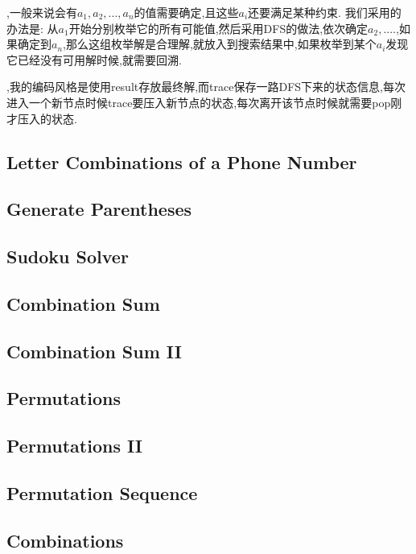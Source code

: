 
,一般来说会有$a_1, a_2, ..., a_n$的值需要确定,且这些$a_i$还要满足某种约束. 我们采用的办法是: 从$a_1$开始分别枚举它的所有可能值,然后采用DFS的做法,依次确定$a_2, ....$,如果确定到$a_n$,那么这组枚举解是合理解,就放入到搜索结果中,如果枚举到某个$a_i$发现它已经没有可用解时候,就需要回溯.

,我的编码风格是使用result存放最终解,而trace保存一路DFS下来的状态信息,每次进入一个新节点时候trace要压入新节点的状态,每次离开该节点时候就需要pop刚才压入的状态.
\subsection{Letter Combinations of a Phone Number}

\subsection{Generate Parentheses}

\subsection{Sudoku Solver}

\subsection{Combination Sum}

\subsection{Combination Sum II}

\subsection{Permutations}

\subsection{Permutations II}

\subsection{Permutation Sequence}

\subsection{Combinations}

